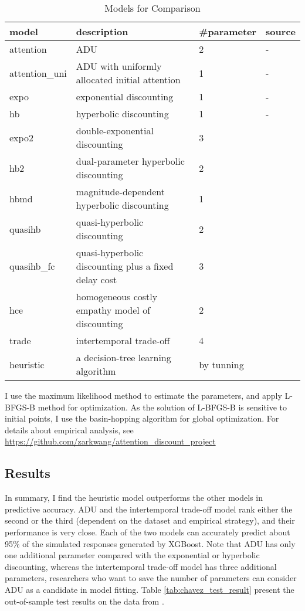 \documentclass[
  12pt,
]{article}
\begin{document}
\begin{longtable}{p{} p{} p{} p{}}
\caption{Models for Comparison}
\label{tab:models}\\
\toprule
\textbf{model} & \textbf{description} & \textbf{\#parameter} & \textbf{  source} \\* \midrule
\endhead
%
\bottomrule
\endfoot
%
\endlastfoot
%
attention & ADU & 2 & - \\
attention\_uni & ADU with uniformly allocated initial attention & 1 &  - \\
expo & exponential discounting & 1 & - \\
hb & hyperbolic discounting & 1 & - \\
expo2 & double-exponential discounting & 3 & \citet{van_den_bos_towards_2013} \\
hb2 & dual-parameter hyperbolic discounting & 2 & \citet{loewenstein_anomalies_1992} \\
hbmd & magnitude-dependent hyperbolic discounting & 1 & \citet{gershman_rationally_2020} \\
quasihb & quasi-hyperbolic discounting & 2 &  \citet{laibson_golden_1997} \\
quasihb\_fc & quasi-hyperbolic discounting plus a fixed delay cost & 
3 & \citet{benhabib_present-bias_2010} \\
hce & homogeneous costly empathy model of discounting & 2 & \citet{noor_optimal_2022}\\
trade & intertemporal trade-off & 4 & \citet{scholten_weighing_2014}\\
heuristic & a decision-tree learning algorithm & by tunning & \citet{chen_xgboost_2016}\\* 
\bottomrule
\end{longtable}

I use the maximum likelihood method to estimate the parameters, and
apply L-BFGS-B method for optimization. As the solution of L-BFGS-B is
sensitive to initial points, I use the basin-hopping algorithm for
global optimization. For details about empirical analysis, see
\href{https://github.com/zarkwang/attention_discount_project.}{https://github.com/zarkwang/attention\_discount\_project}

\hypertarget{results}{%
\subsection{Results}\label{results}}

In summary, I find the heuristic model outperforms the other models in
predictive accuracy. ADU and the intertemporal trade-off model rank
either the second or the third (dependent on the dataset and empirical
strategy), and their performance is very close. Each of the two models
can accurately predict about 95\% of the simulated responses generated
by XGBoost. Note that ADU has only one additional parameter compared
with the exponential or hyperbolic discounting, whereas the
intertemporal trade-off model has three additional parameters,
researchers who want to save the number of parameters can consider ADU
as a candidate in model fitting. Table \ref{tab:chavez_test_result}
present the out-of-sample test results on the data from
\citet{chavez_hierarchical_2017}.
\end{document}
